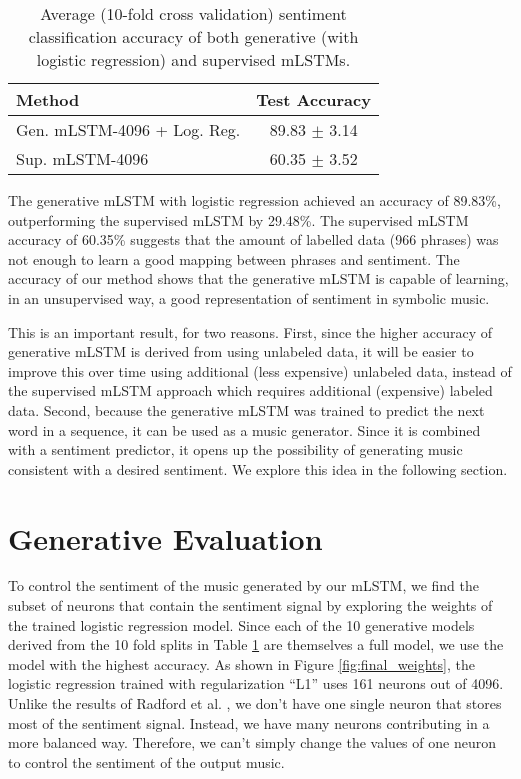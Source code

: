 \begin{table}[!h]
 \begin{center}
 \begin{tabular}{lc}
  \hline
  \textbf{Method} & \textbf{Test Accuracy} \\ \hline
  Gen. mLSTM-4096 + Log. Reg. & 89.83 $\pm$ 3.14\\
  Sup. mLSTM-4096             & 60.35 $\pm$ 3.52 \\
  \hline
 \end{tabular}
\end{center}
\caption{Average (10-fold cross validation) sentiment classification accuracy of both generative (with logistic regression) and supervised mLSTMs.}
 \label{tab:sent_anal}
\end{table}

The generative mLSTM with logistic regression achieved an
accuracy of 89.83\%, outperforming the supervised mLSTM by 29.48\%. The supervised
mLSTM  accuracy of 60.35\% suggests that the amount of labelled data (966 phrases)
was not enough to learn a good mapping between phrases and sentiment.
The accuracy of our method shows that the generative mLSTM is capable of learning, in
an unsupervised way, a good representation of sentiment in symbolic music.

This is an important result, for two reasons. First, since the higher accuracy of generative
mLSTM is derived from using unlabeled data, it will be easier to improve this over time using additional
(less expensive) unlabeled data, instead of the supervised mLSTM approach which requires additional (expensive)
labeled data. Second, because the generative mLSTM was trained to predict the next word in a sequence, it can
be used as a music generator. Since it is combined with a sentiment predictor, it opens up the possibility of
generating music consistent with a desired sentiment. We explore this idea in the following section.

\section{Generative Evaluation}

To control the sentiment of the music generated by our mLSTM, we find the
subset of neurons that contain the sentiment signal by exploring the weights
of the trained logistic regression model. Since each of the 10 generative models derived
from the 10 fold splits in Table \ref{tab:sent_anal} are themselves a full model, we use
the model with the highest accuracy.
As shown in Figure
\ref{fig:final_weights}, the logistic regression trained with regularization ``L1''
uses 161 neurons out of 4096. Unlike the results of Radford et al. \cite{radford_2017},
we don't have one single neuron that stores most of the sentiment signal. Instead,
we have many neurons contributing in a more balanced way. Therefore, we can't simply
change the values of one neuron to control the sentiment of the output music.

